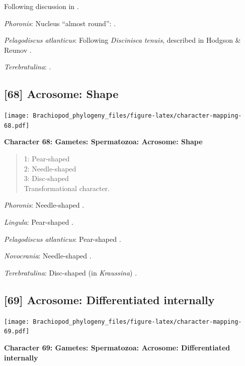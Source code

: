 \documentclass[]{book}
\theoremstyle{definition}
\theoremstyle{definition}
\theoremstyle{definition}
\theoremstyle{remark}
\begin{document}
Following discussion in \citet{Hodgson1994Ultrastructureof}.

\emph{Phoronis}: Nucleus ``almost round'':
\citet{Reunov2004Ultrastructuralstudy}.

\emph{Pelagodiscus atlanticus}: Following \emph{Discinisca}
\emph{tenuis}, described in Hodgson \& Reunov
\citeyearpar{Hodgson1994Ultrastructureof}.

\emph{Terebratulina}: \citet{Hodgson1994Ultrastructureof}.

\hypertarget{acrosome-shape}{%
\subsection*{{[}68{]} Acrosome: Shape}\label{acrosome-shape}}

\texttt{[image: Brachiopod\_phylogeny\_files/figure-latex/character-mapping-68.pdf]}

\textbf{Character 68: Gametes: Spermatozoa: Acrosome: Shape}

\begin{quote}
1: Pear-shaped\\
2: Needle-shaped\\
3: Disc-shaped\\
Transformational character.
\end{quote}

\emph{Phoronis}: Needle-shaped \citep{Reunov2004Ultrastructuralstudy}.

\emph{Lingula}: Pear-shaped \citep{Fukumoto2003Theacrosome}.

\emph{Pelagodiscus atlanticus}: Pear-shaped
\citep{Hodgson1994Ultrastructureof}.

\emph{Novocrania}: Needle-shaped \citep{Afzelius1978Finestructure}.

\emph{Terebratulina}: Disc-shaped (in \emph{Kraussina})
\citep{Hodgson1994Ultrastructureof}.

\hypertarget{acrosome-differentiated-internally}{%
\subsection*{{[}69{]} Acrosome: Differentiated
internally}\label{acrosome-differentiated-internally}}

\texttt{[image: Brachiopod\_phylogeny\_files/figure-latex/character-mapping-69.pdf]}

\textbf{Character 69: Gametes: Spermatozoa: Acrosome: Differentiated
internally}
\end{document}
